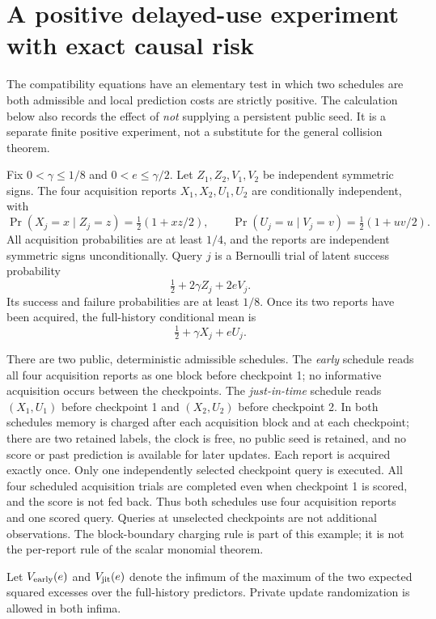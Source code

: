 \section{A positive delayed-use experiment with exact causal risk}
\label{sec:v32-delayed}

The compatibility equations have an elementary test in which two schedules
are both admissible and local prediction costs are strictly positive.
The calculation below also records the effect of \emph{not} supplying a
persistent public seed. It is a separate finite positive experiment,
not a substitute for the general collision theorem.

Fix $0<\gamma\le1/8$ and $0<e\le \gamma/2$. Let
$Z_1,Z_2,V_1,V_2$ be independent symmetric signs. The four acquisition
reports $X_1,X_2,U_1,U_2$ are conditionally independent, with
\[
 \Pr(X_j=x\mid Z_j=z)=\tfrac12(1+xz/2),\qquad
 \Pr(U_j=u\mid V_j=v)=\tfrac12(1+uv/2).
\]
All acquisition probabilities are at least $1/4$, and the reports are
independent symmetric signs unconditionally. Query $j$ is a Bernoulli
trial of latent success probability
\[
             \tfrac12+2\gamma Z_j+2eV_j.
\]
Its success and failure probabilities are at least $1/8$. Once its two
reports have been acquired, the full-history conditional mean is
\begin{equation}\label{eq:v32-delayed-target}
              \tfrac12+\gamma X_j+eU_j.
\end{equation}

There are two public, deterministic admissible schedules. The
\emph{early} schedule reads all four acquisition reports as one block
before checkpoint 1; no informative acquisition occurs between the
checkpoints. The \emph{just-in-time} schedule reads $(X_1,U_1)$ before
checkpoint 1 and $(X_2,U_2)$ before checkpoint 2. In both schedules
memory is charged after each acquisition block and at each checkpoint;
there are two retained labels, the clock is free, no public seed is
retained, and no score or past prediction is available for later updates.
Each report is acquired exactly once. Only one independently selected
checkpoint query is executed. All four scheduled acquisition trials are
completed even when checkpoint 1 is scored, and the score is not fed back.
Thus both schedules use four acquisition reports and one scored query.
Queries at unselected checkpoints are not additional observations. The block-boundary charging
rule is part of this example; it is not the per-report rule of the scalar
monomial theorem.

Let $V_{\rm early}(e)$ and $V_{\rm jit}(e)$ denote the infimum of the
maximum of the two expected squared excesses over the full-history
predictors. Private update randomization is allowed in both infima.

